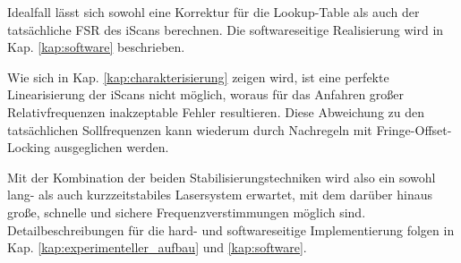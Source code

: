 Idealfall lässt sich sowohl eine Korrektur für die Lookup-Table als auch der tatsächliche FSR des
iScans berechnen. Die softwareseitige Realisierung wird in Kap.
\ref{kap:software} beschrieben.\par
Wie sich in Kap. \ref{kap:charakterisierung} zeigen wird, ist eine perfekte
Linearisierung der iScans nicht möglich, woraus für das Anfahren großer
Relativfrequenzen inakzeptable Fehler resultieren. Diese Abweichung zu den
tatsächlichen Sollfrequenzen kann wiederum durch Nachregeln mit
Fringe-Offset-Locking ausgeglichen werden.\par
Mit der Kombination der beiden Stabilisierungstechniken wird also ein sowohl
lang- als auch kurzzeitstabiles Lasersystem erwartet, mit dem darüber hinaus große, schnelle und sichere Frequenzverstimmungen möglich sind.
Detailbeschreibungen für die hard- und softwareseitige Implementierung folgen in
Kap. \ref{kap:experimenteller_aufbau} und \ref{kap:software}.